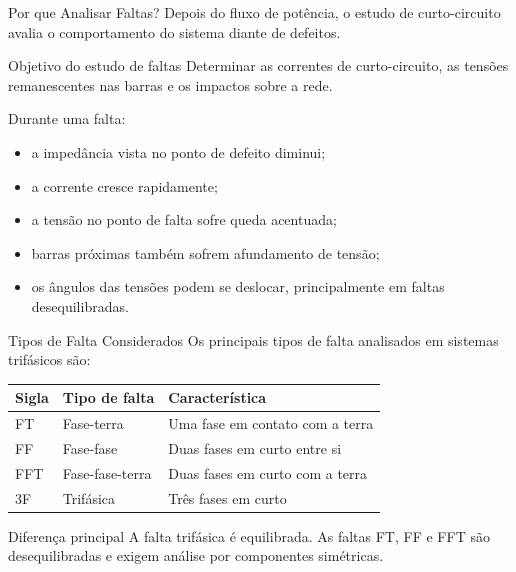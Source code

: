 \documentclass[aspectratio=169,11pt]{beamer}
\begin{document}
\begin{frame}{Por que Analisar Faltas?}
  Depois do fluxo de potência, o estudo de curto-circuito avalia o comportamento do sistema diante de defeitos.

  \begin{block}{Objetivo do estudo de faltas}
    Determinar as correntes de curto-circuito, as tensões remanescentes nas barras e os impactos sobre a rede.
  \end{block}

  Durante uma falta:

  \begin{itemize}
    \item a impedância vista no ponto de defeito diminui;
    \item a corrente cresce rapidamente;
    \item a tensão no ponto de falta sofre queda acentuada;
    \item barras próximas também sofrem afundamento de tensão;
    \item os ângulos das tensões podem se deslocar, principalmente em faltas desequilibradas.
  \end{itemize}
\end{frame}

\begin{frame}{Tipos de Falta Considerados}
  Os principais tipos de falta analisados em sistemas trifásicos são:

  \begin{table}
    \centering
    \small
    \begin{tabular}{lll}
      \toprule
      Sigla & Tipo de falta & Característica \\
      \midrule
      FT & Fase-terra & Uma fase em contato com a terra \\
      FF & Fase-fase & Duas fases em curto entre si \\
      FFT & Fase-fase-terra & Duas fases em curto com a terra \\
      3F & Trifásica & Três fases em curto \\
      \bottomrule
    \end{tabular}
  \end{table}

  \begin{block}{Diferença principal}
    A falta trifásica é equilibrada. As faltas FT, FF e FFT são desequilibradas e exigem análise por componentes simétricas.
  \end{block}
\end{frame}
\end{document}
